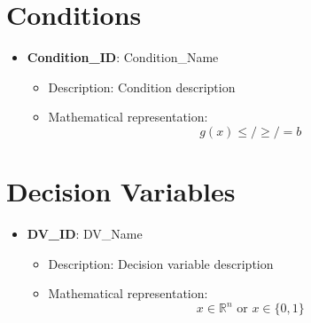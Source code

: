 \documentclass{article}
\begin{document}
\section{Conditions}
\begin{itemize}
    \item \textbf{Condition\_ID}: Condition\_Name
        \begin{itemize}
            \item Description: Condition description
            \item Mathematical representation:
                \begin{equation}
                    g(x) \leq / \geq / = b
                \end{equation}
        \end{itemize}
\end{itemize}

\section{Decision Variables}
\begin{itemize}
    \item \textbf{DV\_ID}: DV\_Name
        \begin{itemize}
            \item Description: Decision variable description
            \item Mathematical representation:
                \begin{equation}
                    x \in \mathbb{R}^n \text{ or } x \in \{0,1\}
                \end{equation}
        \end{itemize}
\end{itemize}
\end{document}
